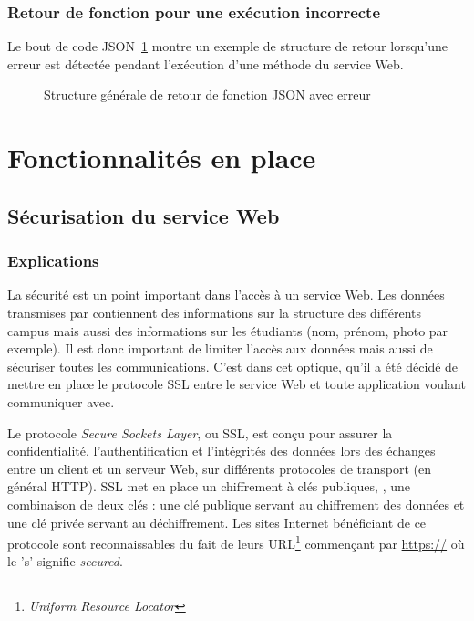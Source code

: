 \subsubsection{Retour de fonction pour une ex\'ecution incorrecte}

Le bout de code JSON~\ref{figure:structureAvecErreurJSON} montre un exemple de structure de retour lorsqu'une erreur est d\'etect\'ee pendant l'ex\'ecution d'une m\'ethode du service Web.

\begin{figure}[!ht]
	\centering
	
	\caption{Structure g\'en\'erale de retour de fonction JSON avec erreur}
	\label{figure:structureAvecErreurJSON}

\end{figure}


\section{Fonctionnalit\'es en place}

\subsection{S\'ecurisation du service Web}
\label{section:securisation}

\subsubsection{Explications}

La s\'ecurit\'e est un point important dans l'acc\`es \`a un service Web. 
Les donn\'ees transmises par \YuukouII{} contiennent des informations sur la structure des diff\'erents campus mais aussi des informations sur les \'etudiants (nom, pr\'enom, photo par exemple).
Il est donc important de limiter l'acc\`es aux donn\'ees mais aussi de s\'ecuriser toutes les communications.
C'est dans cet optique, qu'il a \'et\'e d\'ecid\'e de mettre en place le protocole SSL entre le service Web et toute application voulant communiquer avec.

Le protocole \textit{Secure Sockets Layer}, ou SSL, est con\c{c}u pour assurer la confidentialit\'e, l'authentification et l'int\'egrit\'es des donn\'ees lors des \'echanges entre un client et un serveur Web, sur diff\'erents protocoles de transport (en g\'en\'eral HTTP).
SSL met en place un chiffrement \`a cl\'es publiques, \cad, une combinaison de deux cl\'es : une cl\'e publique servant au chiffrement des donn\'ees et une cl\'e priv\'ee servant au d\'echiffrement.
Les sites Internet b\'en\'eficiant de ce protocole sont reconnaissables du fait de leurs URL\protect\footnote{\textit{Uniform Resource Locator}} commen\c{c}ant par \url{https://} o\`u le 's' signifie \textit{secured}.

